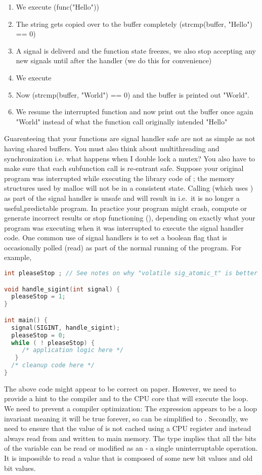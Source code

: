 \begin{enumerate}
\item We execute \keyword(func("Hello"))
\item The string gets copied over to the buffer completely (strcmp(buffer, "Hello") == 0)
\item A signal is deliverd and the function state freezes, we also stop accepting any new signals until after the handler (we do this for convenience)
\item We execute 
\item Now (strcmp(buffer, "World") == 0) and the buffer is printed out "World".
\item We resume the interrupted function and now print out the buffer once again "World" instead of what the function call originally intended "Hello"
\end{enumerate}

Guarenteeing that your functions are signal handler safe are not as simple as not having shared buffers. You must also think about multithreading and synchronization i.e. what happens when I double lock a mutex? You also have to make sure that each subfunction call is re-entrant safe. Suppose your original program was interrupted while executing the library code of  ; the memory structures used by malloc will not be in a consistent state. Calling  (which uses ) as part of the signal handler is unsafe and will result in  i.e.~it is no longer a useful,predictable program. In practice your program might crash, compute or generate incorrect results or stop functioning (), depending on exactly what your program was executing when it was interrupted to execute the signal handler code. One common use of signal handlers is to set a boolean flag that is occasionally polled (read) as part of the normal running of the program. For example,

\begin{lstlisting}[language=C]
int pleaseStop ; // See notes on why "volatile sig_atomic_t" is better

void handle_sigint(int signal) {
  pleaseStop = 1;
}

int main() {
  signal(SIGINT, handle_sigint);
  pleaseStop = 0;
  while ( ! pleaseStop) { 
     /* application logic here */ 
   }
  /* cleanup code here */
}
\end{lstlisting}

The above code might appear to be correct on paper. However, we need to provide a hint to the compiler and to the CPU core that will execute the  loop. We need to prevent a compiler optimization: The expression  appears to be a loop invariant meaning it will be true forever, so can be simplified to . Secondly, we need to ensure that the value of  is not cached using a CPU register and instead always read from and written to main memory. The  type implies that all the bits of the variable can be read or modified as an  - a single uninterruptable operation. It is impossible to read a value that is composed of some new bit values and old bit values.

